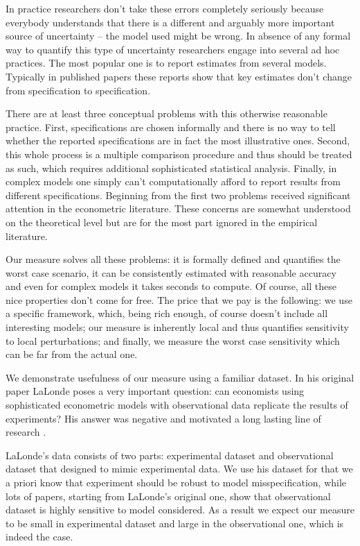 \documentclass[12pt]{article}
\theoremstyle{plain}
\begin{document}
In practice researchers don't take these errors completely seriously because everybody understands that there is a different and arguably more important source of uncertainty -- the model used might be wrong. In absence of any formal way to quantify this type of uncertainty researchers engage into several ad hoc practices. The most popular one is to report estimates from several models. Typically in published papers these reports show that key estimates don't change from specification to specification. 

There are at least three conceptual problems with this otherwise reasonable practice.  First, specifications are chosen informally and there is no way to tell whether the reported specifications are in fact the most illustrative ones. Second, this whole process is a multiple comparison procedure and thus should be treated as such, which requires additional sophisticated statistical analysis. Finally, in complex models one simply can't computationally afford to report results from different specifications. Beginning from \parencite{leamer1983let} the first two problems received significant attention in the econometric literature. These concerns are somewhat understood on the theoretical level but are for the most part ignored in the empirical literature. 

Our measure solves all these problems: it is formally defined and quantifies the worst case scenario, it can be consistently estimated with reasonable accuracy and even for complex models it takes seconds to compute. Of course, all these nice properties don't come for free. The price that we pay is the following: we use a specific framework, which, being rich enough, of course doesn't include all interesting models; our measure is inherently local and thus quantifies sensitivity to local perturbations; and finally, we measure the worst case sensitivity which can be far from the actual one.

We demonstrate usefulness of our measure using a familiar  \parencite{lalonde1986evaluating} dataset. In his original paper LaLonde poses a very important question: can economists using sophisticated econometric models with observational data replicate the results of experiments? His answer was negative and motivated a long lasting line of research \parencite[see][]{dehejia1999causal}. 


LaLonde's data consists of two parts: experimental dataset and observational dataset that designed to mimic experimental data. We use his dataset for that we a priori know that experiment should be robust to model misspecification, while lots of papers, starting from LaLonde's original one, show that observational dataset is highly sensitive to model considered. As a result we expect our measure to be small in experimental dataset and large in the observational one, which is indeed the case. 
\end{document}
